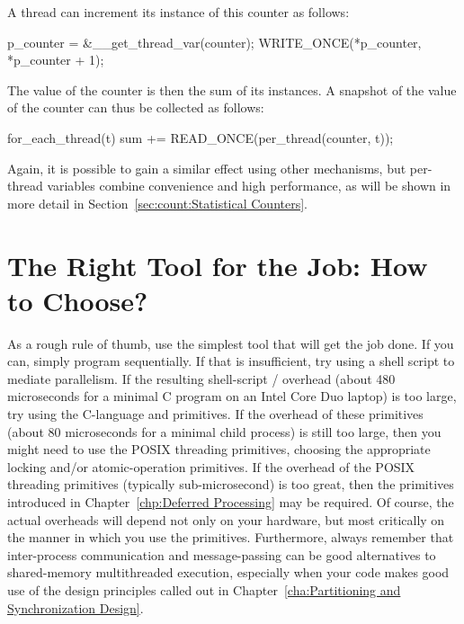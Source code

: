 A thread can increment its instance of this counter as follows:

\begin{VerbatimU}
p_counter = &__get_thread_var(counter);
WRITE_ONCE(*p_counter, *p_counter + 1);
\end{VerbatimU}

The value of the counter is then the sum of its instances.
A snapshot of the value of the counter can thus be collected
as follows:

\begin{VerbatimU}
for_each_thread(t)
  sum += READ_ONCE(per_thread(counter, t));
\end{VerbatimU}

Again, it is possible to gain a similar effect using other mechanisms,
but per-thread variables combine convenience and high performance,
as will be shown in more detail in
Section~\ref{sec:count:Statistical Counters}.

\section{The Right Tool for the Job: How to Choose?}
\label{sec:toolsoftrade:The Right Tool for the Job: How to Choose?}

As a rough rule of thumb, use the simplest tool that will get the job done.
If you can, simply program sequentially.
If that is insufficient, try using a shell script to mediate parallelism.
If the resulting shell-script / overhead
(about 480 microseconds for a minimal C program on an Intel Core Duo
laptop) is too
large, try using the C-language  and  primitives.
If the overhead of these primitives (about 80 microseconds for a minimal
child process) is still too large, then you
might need to use the POSIX threading primitives, choosing the appropriate
locking and/or atomic-operation primitives.
If the overhead of the POSIX threading primitives (typically sub-microsecond)
is too great, then the primitives introduced in
Chapter~\ref{chp:Deferred Processing} may be required.
Of course, the actual overheads will depend not only on your hardware,
but most critically on the manner in which you use the primitives.
Furthermore, always remember that inter-process communication and
message-passing can be good alternatives to shared-memory multithreaded
execution, especially when your code makes good use of the design
principles called out in
Chapter~\ref{cha:Partitioning and Synchronization Design}.

